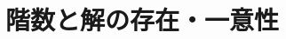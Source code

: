 \documentclass[../../topic_linear-algebra]{subfiles}
\begin{document}
\chapter{階数と解の存在・一意性}






\end{document}

